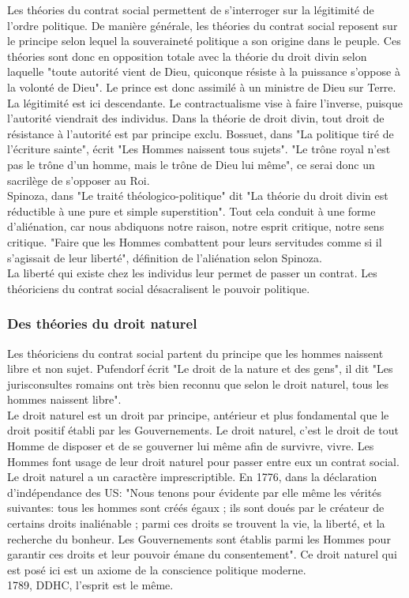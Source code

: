 \documentclass[10pt, a4paper, openany]{book}
\begin{document}
Les théories du contrat social permettent de s'interroger sur la légitimité de l'ordre politique. De manière générale, les théories du contrat social reposent sur le principe selon lequel la souveraineté politique a son origine dans le peuple. Ces théories sont donc en opposition totale avec la théorie du droit divin selon laquelle "toute autorité vient de Dieu, quiconque résiste à la puissance s'oppose à la volonté de Dieu". Le prince est donc assimilé à un ministre de Dieu sur Terre. \\
La légitimité est ici descendante. Le contractualisme vise à faire l'inverse, puisque l'autorité viendrait des individus. Dans la théorie de droit divin, tout droit de résistance à l'autorité est par principe exclu. Bossuet, dans "La politique tiré de l'écriture sainte", écrit "Les Hommes naissent tous sujets". "Le trône royal n'est pas le trône d'un homme, mais le trône de Dieu lui même", ce serai donc un sacrilège de s'opposer au Roi. \\
Spinoza, dans "Le traité théologico-politique" dit "La théorie du droit divin est réductible à une pure et simple superstition". Tout cela conduit à une forme d'aliénation, car nous abdiquons notre raison, notre esprit critique, notre sens critique. "Faire que les Hommes combattent pour leurs servitudes comme si il s'agissait de leur liberté", définition de l'aliénation selon Spinoza. \\
La liberté qui existe chez les individus leur permet de passer un contrat. Les théoriciens du contrat social désacralisent le pouvoir politique. 

\subsubsection{Des théories du droit naturel}

Les théoriciens du contrat social partent du principe que les hommes naissent libre et non sujet. Pufendorf écrit "Le droit de la nature et des gens", il dit "Les jurisconsultes romains ont très bien reconnu que selon le droit naturel, tous les hommes naissent libre". \\
Le droit naturel est un droit par principe, antérieur et plus fondamental que le droit positif établi par les Gouvernements. Le droit naturel, c'est le droit de tout Homme de disposer et de se gouverner lui même afin de survivre, vivre. Les Hommes font usage de leur droit naturel pour passer entre eux un contrat social. \\
Le droit naturel a un caractère imprescriptible. En 1776, dans la déclaration d'indépendance des US: "Nous tenons pour évidente par elle même les vérités suivantes: tous les hommes sont créés égaux ; ils sont doués par le créateur de certains droits inaliénable ; parmi ces droits se trouvent la vie, la liberté, et la recherche du bonheur. Les Gouvernements sont établis parmi les Hommes pour garantir ces droits et leur pouvoir émane du consentement". Ce droit naturel qui est posé ici est un axiome de la conscience politique moderne. \\
1789, DDHC, l'esprit est le même. 
\end{document}
